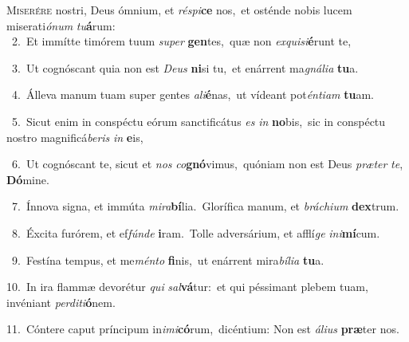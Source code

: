 \lettrine{\initial\textcolor{\initialcolor}{M}}{iserére} nostri, Deus ómnium, et \textit{ré}\-\textit{spi}\textbf{ce} nos,~\star et osténde nobis lucem miserati\-\textit{ó}\-\textit{num} \textit{tu}\-\textbf{á}rum:\\
{\numbfont\textcolor{\numbcolor}{~2.}}~Et immítte timórem tuum \textit{su}\-\textit{per} \textbf{gen}\-tes,~\star quæ non \textit{ex}\-\textit{qui}\textit{si}\textbf{é}runt te,\par
{\numbfont\textcolor{\numbcolor}{~3.}}~Ut cognóscant quia non est \textit{De}\-\textit{us} \textbf{ni}\-si tu,~\star et enárrent ma\-\textit{gná}\-\textit{li}\textit{a} \textbf{tu}\-a.\par
{\numbfont\textcolor{\numbcolor}{~4.}}~Álleva manum tuam super gentes \textit{a}\-\textit{li}\textbf{é}nas,~\star ut vídeant pot\-\textit{én}\-\textit{ti}\textit{am} \textbf{tu}\-am.\par
{\numbfont\textcolor{\numbcolor}{~5.}}~Sicut enim in conspéctu eórum sanctificátus \textit{es} \textit{in} \textbf{no}\-bis,~\star sic in conspéctu nostro magnificá\-\textit{be}\-\textit{ris} \textit{in} \textbf{e}\-is,\par
{\numbfont\textcolor{\numbcolor}{~6.}}~Ut cognóscant te, sicut et \textit{nos} \textit{co}\-\textbf{gnó}vimus,~\star quóniam non est Deus \textit{præ}\-\textit{ter} \textit{te}\-, \textbf{Dó}\-mine.\par
{\numbfont\textcolor{\numbcolor}{~7.}}~Ínnova signa, et immúta \textit{mi}\-\textit{ra}\textbf{bí}lia.~\star Glorífica manum, et \textit{brá}\-\textit{chi}\textit{um} \textbf{dex}\-trum.\par
{\numbfont\textcolor{\numbcolor}{~8.}}~Éxcita furórem, et ef\-\textit{fún}\-\textit{de} \textbf{i}\-ram.~\star Tolle adversárium, et afflí\textit{ge} \textit{in}\-\textit{i}\textbf{mí}cum.\par
{\numbfont\textcolor{\numbcolor}{~9.}}~Festína tempus, et me\-\textit{mén}\-\textit{to} \textbf{fi}\-nis,~\star ut enárrent mira\-\textit{bí}\-\textit{li}\textit{a} \textbf{tu}\-a.\par
{\numbfont\textcolor{\numbcolor}{10.}}~In ira flammæ devorétur \textit{qui} \textit{sal}\-\textbf{vá}tur:~\star et qui péssimant plebem tuam, invéniant \textit{per}\-\textit{di}\textit{ti}\textbf{ó}nem.\par
{\numbfont\textcolor{\numbcolor}{11.}}~Cóntere caput príncipum in\-\textit{i}\-\textit{mi}\textbf{có}rum,~\star dicéntium: Non est \textit{á}\-\textit{li}\textit{us} \textbf{præ}\-ter nos.\par
